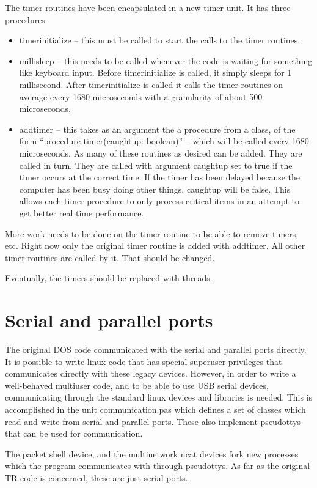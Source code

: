 \documentclass[12pt]{article}
\begin{document}
The timer routines have been encapsulated in a new timer unit. It has
three procedures
\begin{itemize}
\item
timerinitialize -- this must be called to start the calls to the
timer routines.
\item
millisleep -- this needs to be called whenever the code is waiting for
something like keyboard input. Before timerinitialize is called, it
simply sleeps for 1 millisecond. After timerinitialize is
called it calls the timer routines on
average every 1680 microseconds with a granularity of about 500 microseconds,
\item
addtimer -- this takes as an argument the a procedure from a class, of the
form ``procedure timer(caughtup: boolean)'' -- which will be called
every 1680 microseconds. As many of these routines as desired can be added.
They are called in turn. They are called with argument caughtup set to true
if the timer occurs at the correct time. If the timer has been delayed
because the computer has been busy doing other things, caughtup will be
false. This allows each timer procedure to only process critical items
in an attempt to get better real time performance.
\end{itemize}

More work needs to be done on the timer routine to be able to remove
timers, etc. Right now only the original timer routine is added with addtimer.
All other timer routines are called by it. That should be changed.

Eventually, the timers should be replaced with threads.

\section{Serial and parallel ports}
The original DOS code communicated with the serial and parallel ports
directly. It is possible to write linux code that has special
superuser privileges that communicates directly with these legacy devices.
However,
in order to write a well-behaved multiuser code, and to be able to use
USB serial devices, communicating through the standard linux devices
and libraries is needed. This is accomplished in the unit
communication.pas which defines a set of classes which read and write
from serial and parallel ports. These also implement pseudottys that
can be used for communication.

The packet shell device, and the multinetwork ncat devices fork new processes
which the program communicates with through pseudottys. As far as the
original TR code is concerned, these are just serial ports.
\end{document}
